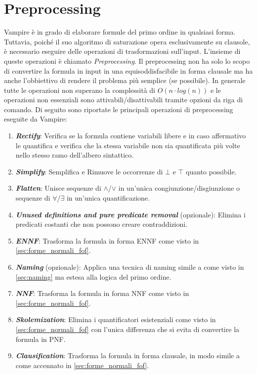 \documentclass[./main.tex]{subfiles}
\begin{document}
\section{Preprocessing} \label{sec:vampire_preprocessing}
Vampire è in grado di elaborare formule del primo ordine in qualsiasi forma. 
Tuttavia, poiché il suo algoritmo di saturazione opera esclusivamente su clausole,
è necessario eseguire delle operazioni di trasformazioni sull'input.
L'insieme di queste operazioni è chiamato \textit{Preprocessing}.
Il preprocessing non ha solo lo scopo di convertire la formula in input in una 
equisoddisfacibile in forma clausale ma ha anche l'obbiettivo di rendere il problema più
semplice (se possibile).
In generale tutte le operazioni non superano la complessità di $O(n \cdot log(n))$ 
e le operazioni non essenziali sono attivabili/disattivabili tramite opzioni da riga di comando.
Di seguito sono riportate le principali operazioni di preprocessing eseguite da Vampire:

\begin{enumerate}
    \item \textbf{\textit{Rectify}}:
    Verifica se la formula contiene variabili libere e in caso affermativo le quantifica
    e verifica che la stessa variabile non sia quantificata più volte nello stesso ramo dell'albero sintattico.
    \item \textbf{\textit{Simplify}}:
    Semplifica e Rimuove le occorrenze di $\bot$ e $\top$ quanto possibile.
    \item \textbf{\textit{Flatten}}:
    Unisce sequenze di $\land$/$\lor$ in un'unica congiunzione/disgiunzione o 
    sequenze di $\forall$/$\exists$ in un'unica quantificazione.
    \item \textbf{\textit{Unused definitions and pure predicate removal}} (opzionale): 
    Elimina i predicati costanti che non possono creare contraddizioni.
    \item \textbf{\textit{ENNF}}:
    Trasforma la formula in forma ENNF come visto in \ref{sec:forme_normali_fof}.
    \item \textbf{\textit{Naming}} (opzionale):
    Applica una tecnica di naming simile a come visto in \ref{sec:naming} ma estesa alla logica del primo ordine.
    \item \textbf{\textit{NNF}}:
    Trasforma la formula in forma NNF come visto in \ref{sec:forme_normali_fof}.
    \item \textbf{\textit{Skolemization}}:
    Elimina i quantificatori esistenziali come visto in \ref{sec:forme_normali_fof} con l'unica 
    differenza che si evita di convertire la formula in PNF.
    \item \textbf{\textit{Clausification}}:
    Trasforma la formula in forma clausale, in modo simile a come accennato in \ref{sec:forme_normali_fof}.
\end{enumerate}
\end{document}
